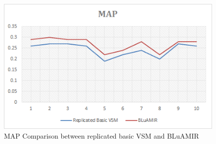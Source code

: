 \documentclass[conference]{IEEEtran}
\begin{document}
\begin{figure}
	\centering
	\includegraphics[scale=0.70]{VSM+AssoTop-MAP}
	\caption {MAP Comparison between replicated basic VSM and BLuAMIR}
	\label{fig:VSM+AssoTop-MAP}
\end{figure}
%
%
\end{document}
